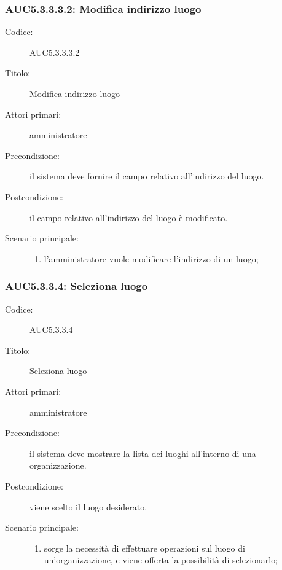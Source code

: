 \documentclass[../../../analisi-dei-requisiti.tex]{subfiles}
\begin{document}
\subsubsection{AUC5.3.3.3.2: Modifica indirizzo luogo}%
\label{subs:AUC5.3.3.3.2}
\begin{description}
  \item[Codice:] AUC5.3.3.3.2
  \item[Titolo:] Modifica indirizzo luogo
  \item[Attori primari:] amministratore
  \item[Precondizione:] il sistema deve fornire il campo relativo all'indirizzo del luogo.
  \item[Postcondizione:] il campo relativo all'indirizzo del luogo è modificato.
  \item[Scenario principale:]
  \begin{enumerate}
    \item l'amministratore vuole modificare l'indirizzo di un luogo;
  \end{enumerate}
\end{description}

\subsubsection{AUC5.3.3.4: Seleziona luogo}%
\label{subs:AUC5.3.3.4}
\begin{description}
  \item[Codice:] AUC5.3.3.4
  \item[Titolo:] Seleziona luogo
  \item[Attori primari:] amministratore
  \item[Precondizione:] il sistema deve mostrare la lista dei luoghi all'interno di una organizzazione.
  \item[Postcondizione:] viene scelto il luogo desiderato.
  \item[Scenario principale:]
  \begin{enumerate}
    \item sorge la necessità di effettuare operazioni sul luogo di un'organizzazione, e viene offerta la possibilità di selezionarlo;
  \end{enumerate}
\end{description}
\end{document}

